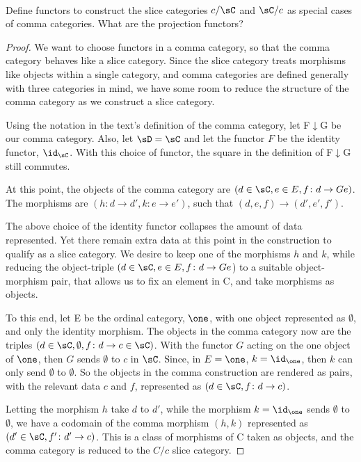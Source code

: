 \documentclass[main.tex]{subfiles}
\begin{document}
\paragraph{}
\begin{exercise}
	Define functors to construct the slice categories $c/\sC$ and $\sC/c$ as special
	cases of comma categories. What are the projection functors?
\end{exercise}

\begin{proof}
	We want to choose functors in a comma category, so that the comma category
	behaves like a slice category. Since the slice category treats morphisms
	like objects within a single category, and comma categories are defined
	generally with three categories in mind, we have some room to reduce the
	structure of the comma category as we construct a slice category.

	Using the notation in the text's definition of the comma category, let
	F$\downarrow$G be our comma category. Also, let $\sD = \sC$ and let the functor
	$F$ be the identity functor, $\id_\sC$. With this choice of functor, the
	square in the definition of F$\downarrow$G still commutes.

	At this point, the objects of the comma category are $(d \in \sC, e\in E, f\colon d
	\rightarrow Ge)$. The morphisms are $(h\colon d\rightarrow d', k\colon e\rightarrow
	e')$, such that $(d,e,f) \rightarrow (d',e',f')$.

	The above choice of the identity functor collapses the amount of data
	represented. Yet there remain extra data at this point in the construction
	to qualify as a slice category. We desire to keep one of the morphisms $h$
	and $k$, while reducing the object-triple $(d \in \sC, e\in E, f\colon d
	\rightarrow Ge$) to a suitable object-morphism pair, that allows us to fix
	an element in C, and take morphisms as objects.

	To this end, let E be the ordinal category, $\one$, with one object
	represented as $\emptyset$, and only the identity morphism. The objects in
	the comma category now are the triples $(d \in \sC, \emptyset, f\colon d
	\rightarrow c \in \sC)$. With the functor $G$ acting on the one object of
	$\one$, then $G$ sends $\emptyset$ to $ c $ in $\sC$. Since, in $E =
	\one$, $k = \id_{\one}$, then $k$ can only send $\emptyset$ to
	$\emptyset$. So the objects in the comma construction are rendered as pairs,
	with the relevant data $c$ and $f$, represented as $(d \in \sC, f\colon d
	\rightarrow c)$.

	Letting the morphism $h$ take $d$ to $d'$, while the morphism $k = \id_{\one}$ sends $\emptyset$ to $\emptyset$, we have a codomain of the comma
	morphism $(h,k)$ represented as $(d' \in \sC, f'\colon d' \rightarrow c)$. This is
	a class of morphisms of C taken as objects, and the comma category is
	reduced to the $C/c$ slice category.
\end{proof}
\end{document}
